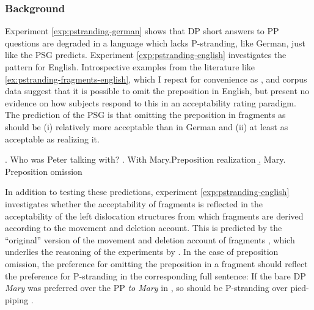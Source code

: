\subsubsection{Background} \label{sec:pstranding-english-background}
Experiment \ref{exp:pstranding-german} shows that DP short answers to PP questions are degraded in a language which lacks P-stranding, like German, just like the PSG predicts. Experiment \ref{exp:pstranding-english} investigates the pattern for English. Introspective examples from the literature like \ref{ex:pstranding-fragments-english}, which I repeat for convenience as \Next, and corpus data \citep{nykiel2017} suggest that it is possible to omit the preposition in English, but \citet{merchant.etal2013} present no evidence on how subjects respond to this in an acceptability rating paradigm. The prediction of the PSG is that omitting the preposition in fragments as \Next should be (i) relatively more acceptable than in German and (ii) at least as acceptable as realizing it.

\ex. Who was Peter talking with?\hfill \citep[685]{merchant2004}
\a. With Mary.\hfill Preposition realization
\b. Mary. \hfill Preposition omission

In addition to testing these predictions, experiment \ref{exp:pstranding-english} investigates whether the acceptability of fragments is reflected in the acceptability of the left dislocation structures from which fragments are derived according to the movement and deletion account. This is predicted by the ``original'' version of the movement and deletion account of fragments \citep{merchant2004}, which underlies the reasoning of the experiments by \citet{merchant.etal2013}. In the case of preposition omission, the preference for omitting the preposition in a fragment should reflect the preference for P-stranding in the corresponding full sentence: If the bare DP \textit{Mary} was preferred over the PP \textit{to Mary} in \Last, so should be P-stranding \Next[a] over pied-piping \Next[b].

